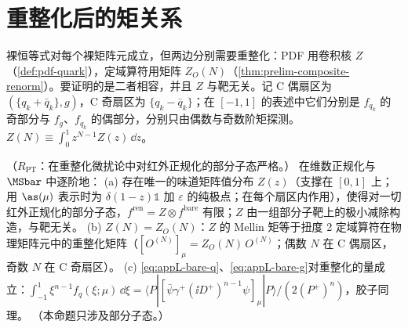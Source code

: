 \section{重整化后的矩关系}\label{sec:appL-renormalized}

裸恒等式对每个裸矩阵元成立，但两边分别需要重整化：PDF 用卷积核 $Z$（\cref{def:pdf-quark}），定域算符用矩阵 $Z_O(N)$（\cref{thm:prelim-composite-renorm}）。要证明的是二者相容，并且 $Z$ 与靶无关。记 C 偶扇区为 $(\{q_k+\bar q_k\},g)$，C 奇扇区为 $\{q_k-\bar q_k\}$；在 $[-1,1]$ 的表述中它们分别是 $f_{q_k}$ 的奇部分与 $f_g$、$f_{q_k}$ 的偶部分，分别只由偶数与奇数阶矩探测。$Z(N)\equiv\int_0^1z^{N-1}Z(z)\,\dd z$。

\begin{proposition}\label{prop:appL-renormalized}
（$R_{\mathrm{PT}}$：在重整化微扰论中对红外正规化的部分子态严格。）
在维数正规化与 $\MSbar$ 中逐阶地：
(a) 存在唯一的味道矩阵值分布 $Z(z)$（支撑在 $[0,1]$ 上；用 $\as(\mu)$ 表示时为 $\delta(1-z)\mathbb 1$ 加 $\varepsilon$ 的纯极点；在每个扇区内作用），使得对一切红外正规化的部分子态，$f^{\mathrm{ren}}=Z\otimes f^{\mathrm{bare}}$ 有限；$Z$ 由一组部分子靶上的极小减除构造，与靶无关。
(b) $Z(N)=Z_O(N)$：$Z$ 的 Mellin 矩等于扭度 2 定域算符在物理矩阵元中的重整化矩阵（$[O^{(N)}]_\mu=Z_O(N)\,O^{(N)}$；偶数 $N$ 在 C 偶扇区，奇数 $N$ 在 C 奇扇区）。
(c) \cref{eq:appL-bare-q}、\cref{eq:appL-bare-g}对重整化的量成立：$\int_{-1}^1\xi^{n-1}f_q(\xi;\mu)\,\dd\xi=\langle P|[\bar\psi\gamma^+(\ii D^+)^{n-1}\psi]_\mu|P\rangle/(2(P^+)^n)$，胶子同理。
（本命题只涉及部分子态。）
\end{proposition}

